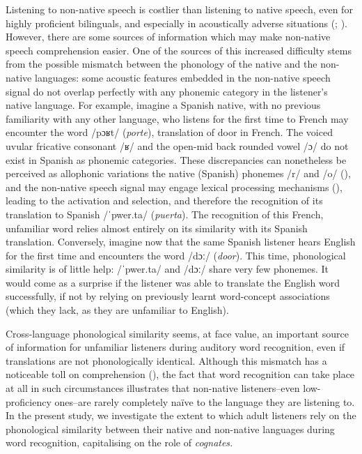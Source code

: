 \documentclass[
]{article}
\begin{document}
Listening to non-native speech is costlier than listening to native
speech, even for highly proficient bilinguals, and especially in
acoustically adverse situations
(;
). However,
there are some sources of information which may make non-native speech
comprehension easier. One of the sources of this increased difficulty
stems from the possible mismatch between the phonology of the native and
the non-native languages: some acoustic features embedded in the
non-native speech signal do not overlap perfectly with any phonemic
category in the listener's native language. For example, imagine a
Spanish native, with no previous familiarity with any other language,
who listens for the first time to French may encounter the word /pɔʁt/
(\emph{porte}), translation of door in French. The voiced uvular
fricative consonant /ʁ/ and the open-mid back rounded vowel /ɔ/ do not
exist in Spanish as phonemic categories. These discrepancies can
nonetheless be perceived as allophonic variations the native (Spanish)
phonemes /r/ and /o/ (), and the non-native speech signal may engage lexical processing
mechanisms (),
leading to the activation and selection, and therefore the recognition
of its translation to Spanish /ˈpwer.ta/ (\emph{puerta}). The
recognition of this French, unfamiliar word relies almost entirely on
its similarity with its Spanish translation. Conversely, imagine now
that the same Spanish listener hears English for the first time and
encounters the word /dɔː/ (\emph{door}). This time, phonological
similarity is of little help: /ˈpwer.ta/ and /dɔː/ share very few
phonemes. It would come as a surprise if the listener was able to
translate the English word successfully, if not by relying on previously
learnt word-concept associations (which they lack, as they are
unfamiliar to English).

Cross-language phonological similarity seems, at face value, an
important source of information for unfamiliar listeners during auditory
word recognition, even if translations are not phonologically identical.
Although this mismatch has a noticeable toll on comprehension
(), the fact that
word recognition can take place at all in such circumstances illustrates
that non-native listeners--even low-proficiency ones--are rarely
completely naïve to the language they are listening to. In the present
study, we investigate the extent to which adult listeners rely on the
phonological similarity between their native and non-native languages
during word recognition, capitalising on the role of \emph{cognates.}
\end{document}
